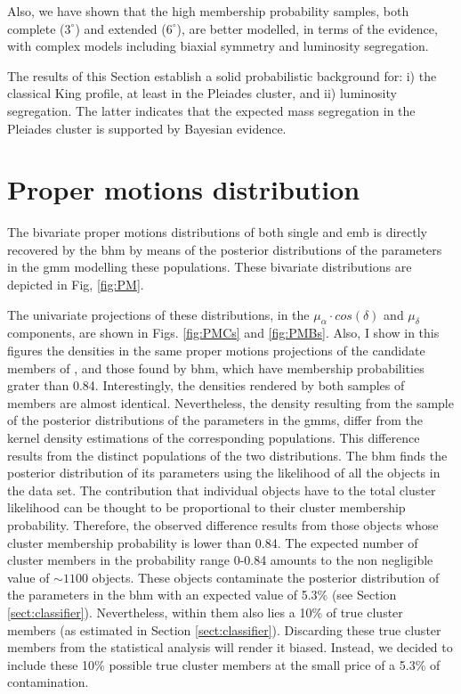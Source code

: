 Also, we have shown that the high membership probability samples, both complete ($3^\circ$) and extended ($6^\circ$), are better modelled, in terms of the evidence, with complex models including biaxial symmetry and luminosity segregation.

The results of this Section establish a solid probabilistic background for: i) the classical King profile, at least in the Pleiades cluster, and ii) luminosity segregation. The latter indicates that the expected mass segregation in the Pleiades cluster \cite[as has been indicated by previous studies, e.g.][]{Converse2010} is supported by Bayesian evidence. 


\section{Proper motions distribution}
\label{sect:PMresults}
The bivariate proper motions distributions of both single and \gls{emb} is directly recovered by the \gls{bhm} by means of the posterior distributions of the parameters in the \gls{gmm} modelling these populations.
These bivariate distributions are depicted in Fig, \ref{fig:PM}.

The univariate projections of these distributions, in the $\mu_{\alpha}\cdot cos(\delta)$ and $\mu_{\delta}$ components, are shown in Figs. \ref{fig:PMCs} and \ref{fig:PMBs}. Also, I show in this figures the densities in the same proper motions projections of the candidate members of \citet{Bouy2015}, and those found by \gls{bhm}, which have membership probabilities grater than 0.84. Interestingly, the densities rendered by both samples of members are almost identical. Nevertheless, the density resulting from the sample of the posterior distributions of the parameters in the \glspl{gmm}, differ from the kernel density estimations of the corresponding populations. This difference results from the distinct populations of the two distributions. The \gls{bhm} finds the posterior distribution of its parameters using the likelihood of all the objects in the data set. The contribution that individual objects have to the total cluster likelihood can be thought to be proportional to their cluster membership probability. Therefore, the observed difference results from those objects whose cluster membership probability is lower than 0.84. The expected number of cluster members in the probability range 0-0.84 amounts to the non negligible value of $\sim 1100$ objects. These objects contaminate the posterior distribution of the parameters in the \gls{bhm} with an expected value of 5.3\% (see Section \ref{sect:classifier}). Nevertheless, within them also lies a 10\% of true cluster members (as estimated in Section \ref{sect:classifier}). Discarding these true cluster members from the statistical analysis will render it biased. Instead, we decided to include these 10\% possible true cluster members at the small price of a 5.3\% of contamination.

